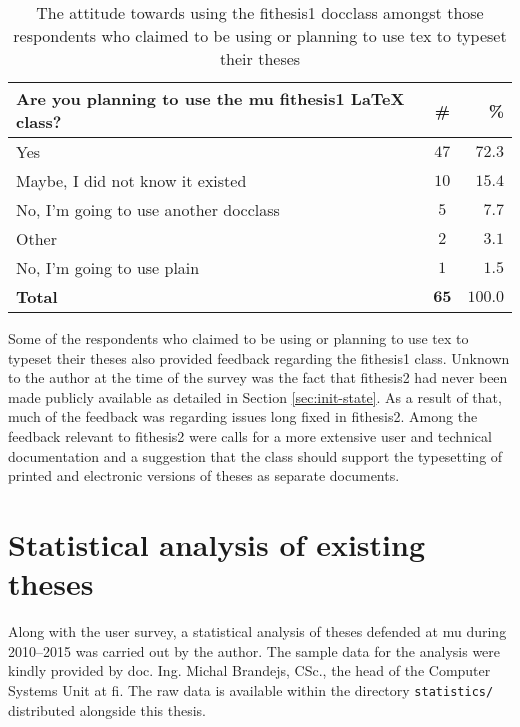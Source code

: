 \documentclass[12pt,twoside,cover,color,table]%
  {fithesis3/fithesis3/fithesis3} %
\begin{document}
  \begin{table}
    \caption{The attitude towards using the \textsf{fithesis1}
      \gls{docclass} amongst those respondents who claimed to
      be using or planning to use \gls{tex} to typeset their theses}
    \begin{tabularx}{\textwidth}{Xcr}
      \textbf{Are you planning to use the \gls{mu}
        \textsf{fithesis1} \LaTeX{} class?} & \textbf{\#} &
        \textbf{\%} \\
      \toprule    Yes                                        & $47$
      & $72.3$ \\ Maybe, I did not know it existed           & $10$
      & $15.4$ \\ No, I'm going to use another \gls{docclass} & $5$
      &  $7.7$ \\ Other                                       & $2$
      &  $3.1$ \\ No, I'm going to use \gls{plain}            & $1$
      &  $1.5$ \\ \bottomrule
      \textbf{Total}             & $\mathbf{65}$ & $\mathbf{100.0}$
    \end{tabularx}
    \label{table:survey-tex}
  \end{table}

  Some of the respondents who claimed to be using or planning to
  use \gls{tex} to typeset their theses also provided feedback
  regarding the \textsf{fithesis1} class. Unknown to the author at
  the time of the survey was the fact that \textsf{fithesis2} had
  never been made publicly available as detailed in Section
  \ref{sec:init-state}. As a result of that, much of the feedback
  was regarding issues long fixed in \textsf{fithesis2}. Among
  the feedback relevant to \textsf{fithesis2} were calls for a more
  extensive user and technical documentation\implemented{} and a
  suggestion that the class should support the typesetting of
  printed and electronic versions of theses as separate
  documents\partimp{}.

  \section{Statistical analysis of existing theses}
  Along with the user survey, a statistical analysis of theses
  defended at \gls{mu} during 2010--2015 was carried out by the
  author. The sample data for the analysis were kindly provided by
  doc. Ing. Michal Brandejs, CSc., the head of the Computer Systems
  Unit at \gls{fi}. The raw data is available within the directory
  \texttt{statistics/} distributed alongside this thesis.
\end{document}
